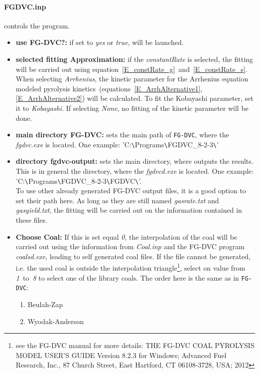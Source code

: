 \paragraph{FGDVC.inp} controls the \FGDVC program.
\begin{itemize}
 \item \textbf{use FG-DVC?:}  if set to \emph{yes} or \emph{true}, \CPD will be launched.
 \item \textbf{selected fitting Approximation:} if the \emph{constantRate} is selected, the fitting will be carried out using equation~\ref{E_constRate_g}~and~\ref{E_constRate_s}. When selecting \emph{Arrhenius}, the kinetic parameter for the Arrhenius equation modeled pyrolysis kinetics~(equations~\ref{E_ArrhAlternative1},\ref{E_ArrhAlternative2}) will be calculated. To fit the Kobayashi parameter, set it to \emph{Kobayashi}. If selecting \emph{None}, no fitting of the kinetic parameter will be done.
 \item \textbf{main directory FG-DVC:} sets the main path of \texttt{FG-DVC}, where the \emph{fgdvc.exe} is located. One example: '{C:\verb|\|Programs\verb|\|FGDVC\_8-2-3\verb|\|}'
 \item \textbf{directory fgdvc-output:} sets the main directory, where \FGDVC outputs the results. This is in general the directory, where the \emph{fgdvcd.exe} is located. One example: '{C:\verb|\|Programs\verb|\|FGDVC\_8-2-3\verb|\|FGDVC\verb|\|}'.\\To use other already generated FG-DVC output files, it is a good option to set their path here. As long as they are still named \emph{gasrate.txt} and \emph{gasyield.txt}, the fitting will be carried out on the information contained in these files.
 \item \textbf{Choose Coal:} If this is set equal \emph{0}, the interpolation of the coal will be carried out using the information from \emph{Coal.inp} and the FG-DVC program \emph{coalsd.exe}, leading to self generated \FGDVC coal files. If the file cannot be generated, i.e. the used coal is outside the interpolation triangle\footnote{see the FG-DVC manual for more details: THE FG-DVC COAL PYROLYSIS MODEL USER'S GUIDE Version 8.2.3 for Windows; Advanced Fuel Research, Inc., 87 Church Street, East Hartford, CT 06108-3728, USA; 2012}, select on value from \emph{1}~to~\emph{8} to select one of the library coals. The order here is the same as in \texttt{FG-DVC}:
 \begin{enumerate}
  \item Beulah-Zap
  \item Wyodak-Anderson

\end{enumerate}
\end{itemize}
